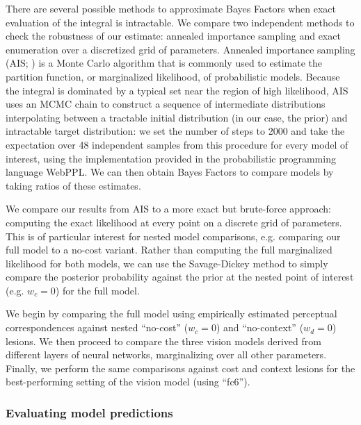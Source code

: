 \documentclass[9pt,twocolumn,twoside]{pnas-new}
\begin{document}
{There are several possible methods to approximate Bayes Factors when exact evaluation of the integral is intractable. We compare two independent methods to check the robustness of our estimate: annealed importance sampling and exact enumeration over a discretized grid of parameters. Annealed importance sampling (AIS; \cite{neal2001annealed}) is a Monte Carlo algorithm that is commonly used to estimate the partition function, or marginalized likelihood, of probabilistic models. Because the integral is dominated by a typical set near the region of high likelihood, AIS uses an MCMC chain to construct a sequence of intermediate distributions interpolating between a tractable initial distribution (in our case, the prior) and intractable target distribution: we set the number of steps to 2000 and take the expectation over 48 independent samples from this procedure for every model of interest, using the implementation provided in the probabilistic programming language WebPPL. We can then obtain Bayes Factors to compare models by taking ratios of these estimates.

We compare our results from AIS to a more exact but brute-force approach: computing the exact likelihood at every point on a discrete grid of parameters.
This is of particular interest for nested model comparisons, e.g. comparing our full model to a no-cost variant.
Rather than computing the full marginalized likelihood for both models, we can use the Savage-Dickey method \cite{wagenmakers2010bayesian} to simply compare the posterior probability against the prior at the nested point of interest (e.g. $w_c = 0$) for the full model.

We begin by comparing the full model using empirically estimated perceptual correspondences against nested ``no-cost'' ($w_c = 0$) and ``no-context'' ($w_d = 0$) lesions. We then proceed to compare the three vision models derived from different layers of neural networks, marginalizing over all other parameters. Finally, we perform the same comparisons against cost and context lesions for the best-performing setting of the vision model (using ``fc6'').

\subsubsection*{Evaluating model predictions}

}
\end{document}
